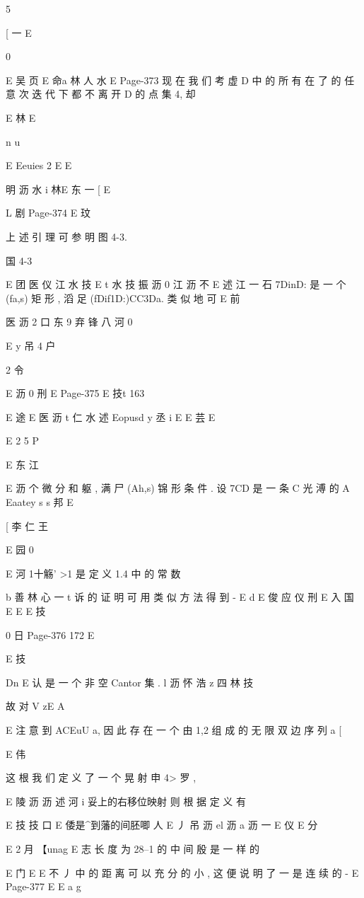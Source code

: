 {{{{{{{{{{{{{{{5

[ 一
E

0

E 吴 页
E 命a 林 人 水
E
Page-373
现 在 我 们 考 虚 D 中 的 所 有 在 了 的 任 意 次 迭 代 下 都 不 离 开 D
的 点 集 4, 却

E 林
E

n
u

E
Eeuies 2 E
E

明 沥 水 i 林E 东 一 [
E

L 剧
Page-374
E 玟

上 述 引 理 可 参 明 图 4-3.

国 4-3

E 团 医 仪 江 水 技
E t 水 技 振 沥
0
江
沥 不
E 述 江 一 石
7DinD: 是 一 个 (fa,s) 矩 形 , 滔 足 (fDif1D:)CC3Da. 类 似 地 可
E 前

医 沥 2 口 东 9 弃 锋 八 河
0

E y 吊 4 户

2
令

E 沥 0 刑
E
Page-375
E 技t 163

E 途
E
医 沥 t 仁 水 述
Eopusd y 丞 i
E
E
芸 E

E
2 5
P

E 东 江

E 沥
个 微 分 和 躯 , 满 尸 (Ah,s) 锦 形 条 件 . 设 7CD 是 一 条 C 光 溥 的 A
Eaatey s s 邦
E

[ 李 仁 王

E 园 0

E 河 1十觞'
>1 是 定 义 1.4 中 的 常 数

b 善 林 心 一 t
诉 的 证 明 可 用 类 似 方 法 得 到 -
E
d
E 俊 应 仪
刑
E
入
国 E
E
E 技

0 日
Page-376
172 E

E
技

Dn
E 认
是 一 个 非 空 Cantor 集 .
l 沥 怀 浩 z 四 林 技

故 对 V zE A

E
注 意 到 ACEuU a, 因 此 存 在 一 个 由 1,2 组 成 的 无 限 双 边 序 列 a
[

E 伟

这 根 我 们 定 义 了 一 个 晃 射 申 4> 罗 ,

E
陵 沥 沥 述 河 i 妥上的右移位映射 则 根 据 定 义 有

E 技 技 口
E 倭是^到藩的间胚唧 人
E 丿 吊 沥 el 沥
a 沥 一
E 仪
E 分

E 2 月
【unag E 志
长 度 为 28--1 的 中 间 殷 是 一 样 的

E 门 E
E 不
丿 中 的 距 离 可 以 充 分 的 小 , 这 便 说 明 了 一 是 连 续 的 -
E
Page-377
E E a g

}}}}}}}}}}}}}}}
